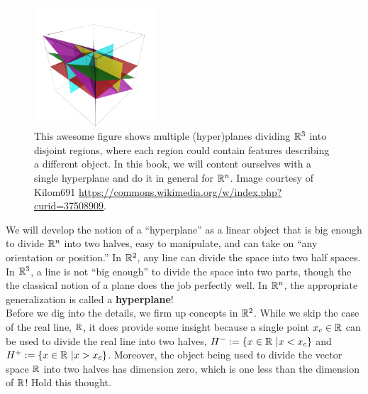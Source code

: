 \begin{figure}[hbt!]
\centering
\includegraphics[width=0.4\textwidth]{graphics/Chap13SeparatingHyperplanes/Arrangement_hyperplans.png}
\caption[]{This awesome figure shows multiple (hyper)planes dividing $\mathbb R^3$ into disjoint regions, where each region could contain features describing a different object. In this book, we will content ourselves with a single hyperplane and do it in general for $\mathbb R^n$. Image courtesy of Kilom691 \url{ https://commons.wikimedia.org/w/index.php?curid=37508909}. } 
\label{fig:HyperplaneArrangment}
\end{figure}

We will develop the notion of a ``hyperplane'' as a linear object that is big enough to divide $\mathbb R^n$ into two halves, easy to manipulate, and can take on ``any orientation or position.'' In $\mathbb R^2$, any line can divide the space into two half spaces. In $\mathbb R^3$, a line is not ``big enough'' to divide the space into two parts, though the the classical notion of a plane does the job perfectly well. In $\mathbb R^n$, the appropriate generalization is called a \textbf{hyperplane}! \\

Before we dig into the details, we firm up concepts in $\mathbb R^2$. While we skip the case of the real line, $\mathbb R$, it does provide some insight because a single point $x_c \in \mathbb R$ can be used to divide the real line into two halves, $H^-:=\{x \in \mathbb R~| x < x_c\}$ and $H^+:=\{x \in \mathbb R~| x > x_c\}$. Moreover, the object being used to divide the vector space $\mathbb R$ into two halves has dimension zero, which is one less than the dimension of $\mathbb R$! Hold this thought.

\vspace*{0.2cm}


